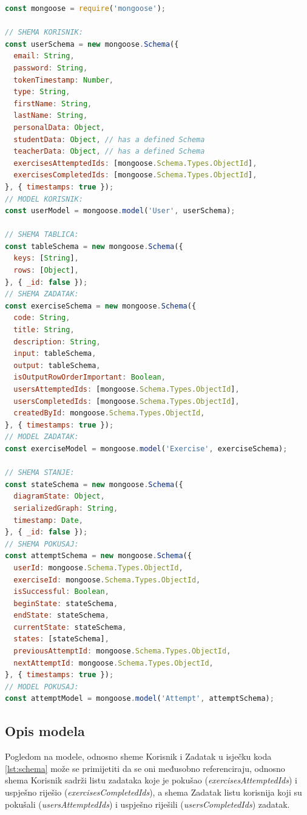 \documentclass[times, utf8, diplomski, numeric]{fer}
\newcommand{\razmakp}{\vspace{18pt}}
\newcommand{\razmaks}{\vspace{10pt}}
\begin{document}
\razmakp %
\begin{lstlisting}[language=JavaScript, caption={Pojednostavljena verzija podatkovnih modela, odnosno Mongoose shema dokumenata spremljenih u Mongo bazi}, label={lst:schema}]
const mongoose = require('mongoose');

// SHEMA KORISNIK:
const userSchema = new mongoose.Schema({
  email: String,
  password: String,
  tokenTimestamp: Number,
  type: String,
  firstName: String,
  lastName: String,
  personalData: Object,
  studentData: Object, // has a defined Schema
  teacherData: Object, // has a defined Schema
  exercisesAttemptedIds: [mongoose.Schema.Types.ObjectId],
  exercisesCompletedIds: [mongoose.Schema.Types.ObjectId],
}, { timestamps: true });
// MODEL KORISNIK:
const userModel = mongoose.model('User', userSchema);

// SHEMA TABLICA:
const tableSchema = new mongoose.Schema({
  keys: [String],
  rows: [Object],
}, { _id: false });
// SHEMA ZADATAK:
const exerciseSchema = new mongoose.Schema({
  code: String,
  title: String,
  description: String,
  input: tableSchema,
  output: tableSchema,
  isOutputRowOrderImportant: Boolean,
  usersAttemptedIds: [mongoose.Schema.Types.ObjectId],
  usersCompletedIds: [mongoose.Schema.Types.ObjectId],
  createdById: mongoose.Schema.Types.ObjectId,
}, { timestamps: true });
// MODEL ZADATAK:
const exerciseModel = mongoose.model('Exercise', exerciseSchema);

// SHEMA STANJE:
const stateSchema = new mongoose.Schema({
  diagramState: Object,
  serializedGraph: String,
  timestamp: Date,
}, { _id: false });
// SHEMA POKUSAJ:
const attemptSchema = new mongoose.Schema({
  userId: mongoose.Schema.Types.ObjectId,
  exerciseId: mongoose.Schema.Types.ObjectId,
  isSuccessful: Boolean,
  beginState: stateSchema,
  endState: stateSchema,
  currentState: stateSchema,
  states: [stateSchema],
  previousAttemptId: mongoose.Schema.Types.ObjectId,
  nextAttemptId: mongoose.Schema.Types.ObjectId,
}, { timestamps: true });
// MODEL POKUSAJ:
const attemptModel = mongoose.model('Attempt', attemptSchema);
\end{lstlisting}
\razmaks

\subsection{Opis modela}

Pogledom na modele, odnosno sheme Korisnik i Zadatak u isječku koda \ref{lst:schema} može se primijetiti da se oni međusobno referenciraju, odnosno shema Korisnik sadrži listu zadataka koje je pokušao (\emph{exercisesAttemptedIds}) i uspješno riješio (\emph{exercisesCompletedIds}), a shema Zadatak listu korisnija koji su pokušali (\emph{usersAttemptedIds}) i uspješno riješili (\emph{usersCompletedIds}) zadatak.
\end{document}
